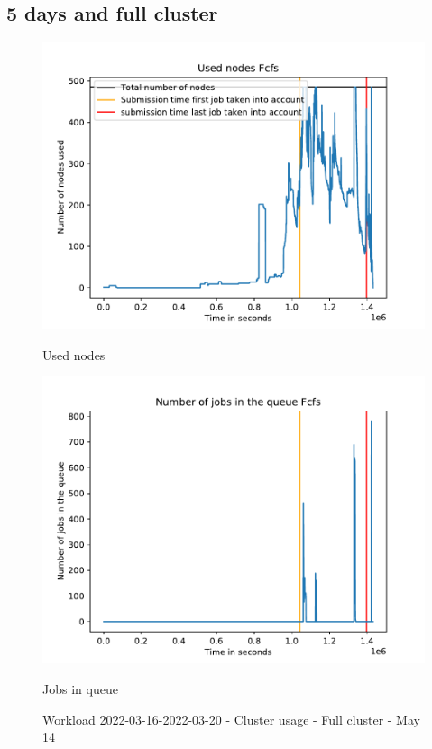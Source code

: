 \documentclass[a4paper]{article}
\begin{document}
	\subsection{5 days and full cluster}
	\begin{figure}[H]\begin{minipage}[b]{0.5\linewidth}\centering\includegraphics[width=1\linewidth]{MBSS/plot/2022-03-16->2022-03-20_Fcfs_Used_nodes_450_128_32_256_4_1024.pdf}\caption{Used nodes}\vspace{4ex}\end{minipage}%
	\begin{minipage}[b]{0.5\linewidth}\centering\includegraphics[width=1\linewidth]{MBSS/plot/2022-03-16->2022-03-20_Fcfs_Nb_scheduled_jobs_450_128_32_256_4_1024.pdf}\caption{Jobs in queue}\vspace{4ex}\end{minipage}\caption{Workload 2022-03-16-2022-03-20 - Cluster usage - Full cluster - May 14}\end{figure}
	
\end{document}
